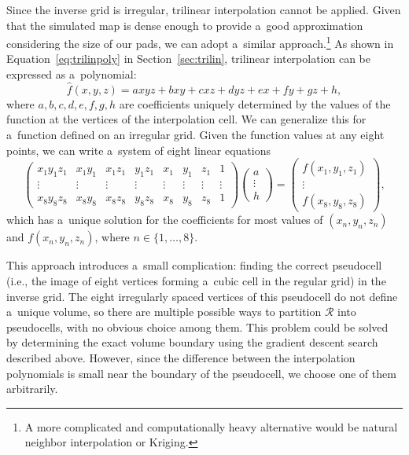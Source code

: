 			Since the inverse grid is irregular, trilinear interpolation cannot be applied. Given that the simulated map is dense enough to provide a~good approximation considering the size of our pads, we can adopt a~similar approach.\footnote{A more complicated and computationally heavy alternative would be natural neighbor interpolation or Kriging.} As shown in Equation~\ref{eq:trilinpoly} in Section~\ref{sec:trilin}, trilinear interpolation can be expressed as a~polynomial:
				\begin{equation}
					\widehat{f}(x,y,z) = axyz + bxy + cxz + dyz + ex + fy + gz + h,
				\end{equation}
			where $a,b,c,d,e,f,g,h$ are coefficients uniquely determined by the values of the function at the vertices of the interpolation cell. We can generalize this for a~function defined on an irregular grid. Given the function values at any eight points, we can write a~system of eight linear equations
				\begin{equation}
					\begin{pmatrix}
						x_1 y_1 z_1 & x_1 y_1 & x_1 z_1 & y_1 z_1 & x_1 & y_1 & z_1 & 1\\
						\vdots & \vdots & \vdots & \vdots & \vdots & \vdots & \vdots & \vdots\\
						x_8 y_8 z_8 & x_8 y_8 & x_8 z_8 & y_8 z_8 & x_8 & y_8 & z_8 & 1
					\end{pmatrix}
					\begin{pmatrix}
						a\\
						\vdots\\
						h
					\end{pmatrix}
					=
					\begin{pmatrix}
						f(x_1,y_1,z_1)\\
						\vdots\\
						f(x_8,y_8,z_8)
					\end{pmatrix},
				\end{equation}
			which has a~unique solution for the coefficients for most values of $(x_n, y_n, z_n)$ and $f(x_n,y_n,z_n)$, where $n\in\{1,\ldots,8\}$.
			
			This approach introduces a~small complication: finding the correct pseudocell (i.e., the image of eight vertices forming a~cubic cell in the regular grid) in the inverse grid. The eight irregularly spaced vertices of this pseudocell do not define a~unique volume, so there are multiple possible ways to partition $\mathcal{R}$ into pseudocells, with no obvious choice among them. This problem could be solved by determining the exact volume boundary using the gradient descent search described above. However, since the difference between the interpolation polynomials is small near the boundary of the pseudocell, we choose one of them arbitrarily.
			
